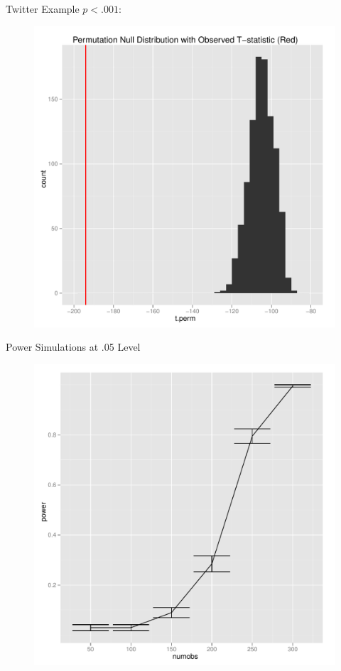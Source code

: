 \documentclass{beamer}
\begin{document}
\begin{frame}{Twitter Example}
  $p < .001$:
    \begin{figure}[!ht]
   \centering
   \includegraphics[scale=.4]{pres6.pdf}  
 \end{figure}
\end{frame}

\begin{frame}{Power Simulations at .05 Level}
   \begin{figure}[!ht]
   \centering
   \includegraphics[scale=.4]{pres7.pdf}  
 \end{figure}
\end{frame}
\end{document}
